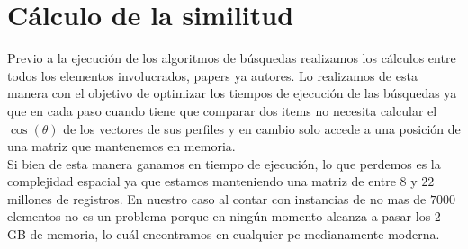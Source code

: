 \section{Cálculo de la similitud}
Previo a la ejecución de los algoritmos de búsquedas realizamos los cálculos entre todos los elementos involucrados, papers ya autores. Lo realizamos de esta manera con el objetivo de optimizar los tiempos de ejecución de las búsquedas ya que en cada paso cuando tiene que comparar dos items no necesita calcular el $\cos(\theta)$ de los vectores de sus perfiles y en cambio solo accede a una posición de una matriz que mantenemos en memoria.\\
Si bien de esta manera ganamos en tiempo de ejecución, lo que perdemos es la complejidad espacial ya que estamos manteniendo una matriz de entre $8$ y $22$ millones de registros. En nuestro caso al contar con instancias de no mas de $7000$ elementos no es un problema porque en ningún momento alcanza a pasar los $2$ GB de memoria, lo cuál encontramos en cualquier pc medianamente moderna.\\

